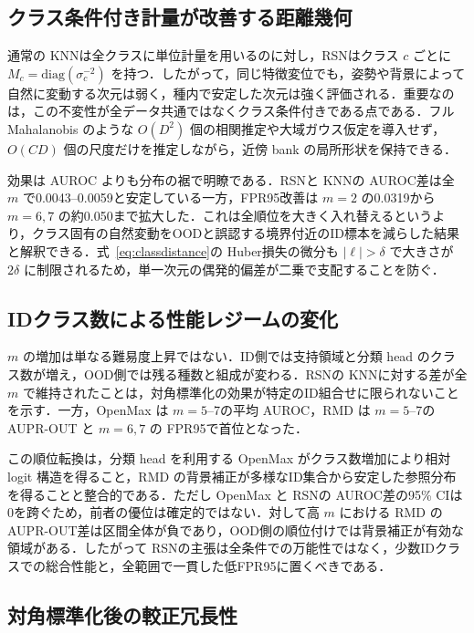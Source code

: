 \documentclass[uplatex,dvipdfmx,a4paper,10pt,twocolumn]{bxjsarticle}
\newcommand{\RSN}{RSN}
\newcommand{\knn}{KNN}
\begin{document}
\subsection{クラス条件付き計量が改善する距離幾何}

通常の \knn は全クラスに単位計量を用いるのに対し，\RSN はクラス $c$ ごとに $M_c=\mathrm{diag}(\sigma_c^{-2})$ を持つ．したがって，同じ特徴変位でも，姿勢や背景によって自然に変動する次元は弱く，種内で安定した次元は強く評価される．重要なのは，この不変性が全データ共通ではなくクラス条件付きである点である．フル Mahalanobis のような $O(D^2)$ 個の相関推定や大域ガウス仮定を導入せず，$O(CD)$ 個の尺度だけを推定しながら，近傍 bank の局所形状を保持できる．

効果は AUROC よりも分布の裾で明瞭である．\RSN と \knn の AUROC差は全 $m$ で0.0043--0.0059と安定している一方，FPR95改善は $m=2$ の0.0319から $m=6,7$ の約0.050まで拡大した．これは全順位を大きく入れ替えるというより，クラス固有の自然変動をOODと誤認する境界付近のID標本を減らした結果と解釈できる．式~\eqref{eq:classdistance}の Huber損失の微分も $|\ell|>\delta$ で大きさが $2\delta$ に制限されるため，単一次元の偶発的偏差が二乗で支配することを防ぐ．

\subsection{IDクラス数による性能レジームの変化}

$m$ の増加は単なる難易度上昇ではない．ID側では支持領域と分類 head のクラス数が増え，OOD側では残る種数と組成が変わる．\RSN の \knn に対する差が全 $m$ で維持されたことは，対角標準化の効果が特定のID組合せに限られないことを示す．一方，OpenMax は $m=5$--7の平均 AUROC，RMD は $m=5$--7の AUPR-OUT と $m=6,7$ の FPR95で首位となった．

この順位転換は，分類 head を利用する OpenMax がクラス数増加により相対 logit 構造を得ること，RMD の背景補正が多様なID集合から安定した参照分布を得ることと整合的である．ただし OpenMax と \RSN の AUROC差の95\% CIは0を跨ぐため，前者の優位は確定的ではない．対して高 $m$ における RMD の AUPR-OUT差は区間全体が負であり，OOD側の順位付けでは背景補正が有効な領域がある．したがって \RSN の主張は全条件での万能性ではなく，少数IDクラスでの総合性能と，全範囲で一貫した低FPR95に置くべきである．

\subsection{対角標準化後の較正冗長性}
\end{document}
